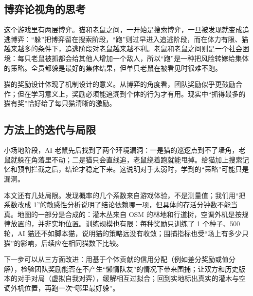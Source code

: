 \documentclass[a4paper,zihao=5,fontset=fandol,UTF8]{ctexart}
\begin{document}
\subsection{博弈论视角的思考}
这个游戏里有两层博弈。猫和老鼠之间，一开始是搜索博弈，一旦被发现就变成追逃博弈：“躲”把博弈留在搜索阶段，“跑”则过早进入追逃阶段，而在体力有限、猫越来越多的条件下，追逃阶段对老鼠越来越不利。老鼠和老鼠之间则是一个社会困境：每只老鼠被抓都会给其他人增加一个敌人，所以“跑”是一种把风险转嫁给集体的策略。全员都躲是最好的集体结果，但单只老鼠在被看见时很难不跑。

猫的奖励设计体现了机制设计的意义。从博弈的角度看，团队奖励似乎更鼓励合作；但在学习意义上，奖励必须能追溯到个体的行为才有用。现实中“抓得最多的猫有奖”恰好给了每只猫清晰的激励。

\subsection{方法上的迭代与局限}
小场地阶段，AI 老鼠先后找到了两个环境漏洞：一是猫的巡逻点到不了墙角，老鼠就躲在角落里不动；二是猫只会直线追，老鼠绕着跑就能甩掉。给猫加上搜索记忆和预判拦截之后，结论才稳定下来。这说明对手太弱时，学到的“策略”可能只是漏洞。

本文还有几处局限。发现概率的几个系数来自游戏体验，不是测量值；我们用“把系数改成 1”的敏感性分析说明了结论依赖哪一项，但具体的存活分钟数不能当真。地图的一部分是合成的：灌木丛来自 OSM 的林地和行道树，空调外机是按规律放置的，并非实地位置。训练规模也有限：每种奖励只训练了 1 个种子、500 轮，AI 猫还不如脚本猫，说明猫的策略远没有收敛；围捕指标也受“场上有多少只猫”的影响，后续应在相同猫数下比较。

下一步可以从三方面改进：用基于个体贡献的信用分配（例如差分奖励或值分解），检验团队奖励能否在不产生“懒惰队友”的情况下带来围捕；让双方和历史版本的对手对局（虚拟自我对弈），缓解相互过拟合；回到实地标出真实的灌木与空调外机位置，再跑一次“哪里最好躲”。
\end{document}
